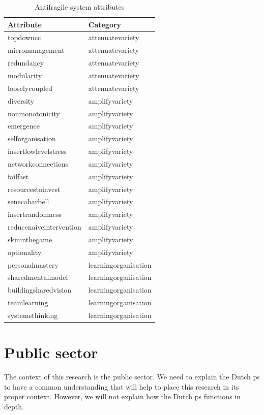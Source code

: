 \begin{longtable}{@{}p{}p{}@{}}
	\toprule%
	\textbf{Attribute} & \textbf{Category} \\%
	\midrule%
	\endhead%
	\hline
	\endfoot%
	\caption[Antifragile system attributes]{Antifragile system attributes}
	\label{tab:attributesofantifragile}
	\endlastfoot%
	\Gls{topdowncc} & \Gls{attenuatevariety} \\%
	\Gls{micromanagement} & \Gls{attenuatevariety} \\%
	\Gls{redundancy} & \Gls{attenuatevariety} \\%
	\Gls{modularity} & \Gls{attenuatevariety} \\%
	\Gls{looselycoupled} & \Gls{attenuatevariety} \\%
	\Gls{diversity} & \Gls{amplifyvariety} \\%
	\Gls{nonmonotonicity} & \Gls{amplifyvariety} \\%
	\Gls{emergence} & \Gls{amplifyvariety} \\%
	\Gls{selforganisation} & \Gls{amplifyvariety} \\%
	\Gls{insertlowlevelstress} & \Gls{amplifyvariety} \\%
	\Gls{networkconnections}  & \Gls{amplifyvariety} \\%
	\Gls{failfast} & \Gls{amplifyvariety} \\%
	\Gls{resourcestoinvest} & \Gls{amplifyvariety} \\%
	\Gls{senecabarbell} & \Gls{amplifyvariety} \\%
	\Gls{insertrandomness} & \Gls{amplifyvariety} \\%
	\Gls{reducenaiveintervention} & \Gls{amplifyvariety} \\%
	\Gls{skininthegame} & \Gls{amplifyvariety} \\%
	\Gls{optionality} &  \Gls{amplifyvariety} \\%
	\Gls{personalmastery} &  \Gls{learningorganisation} \\%
	\Gls{sharedmentalmodel} &  \Gls{learningorganisation} \\%
	\Gls{buildingsharedvision} &  \Gls{learningorganisation} \\%
	\Gls{teamlearning} &  \Gls{learningorganisation} \\%
	\Gls{systemsthinking} &  \Gls{learningorganisation} \\%
	\bottomrule%
\end{longtable}

\section{Public sector}
\label{sec:tbpublicsector}
The context of this research is the public sector. We need to explain the Dutch \gls{ps} to have a common understanding that will help to place this research in its proper context. However, we will not explain how the Dutch \gls{ps} functions in depth.

